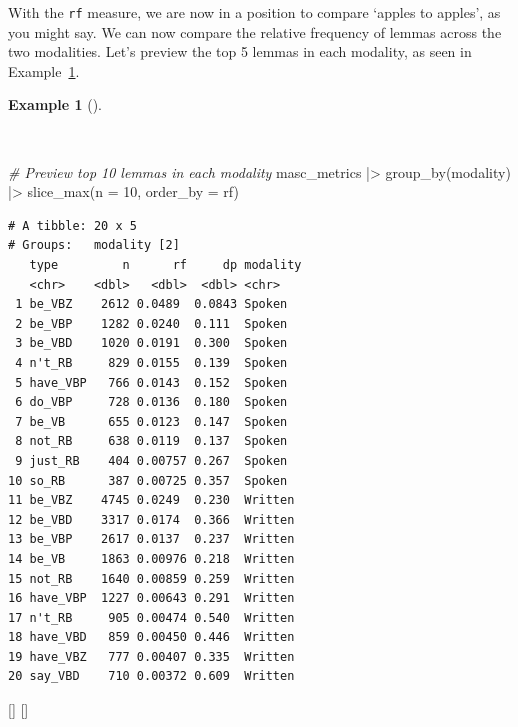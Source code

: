 \documentclass[
  letterpaper,
  krantz1]{latex/krantz-mod}
\newenvironment{Shaded}{\begin{snugshade}}{\end{snugshade}}
\newcommand{\AttributeTok}[1]{\textcolor[rgb]{0.00,0.00,0.00}{#1}}
\newcommand{\CommentTok}[1]{\textcolor[rgb]{0.00,0.00,0.00}{\textit{#1}}}
\newcommand{\DecValTok}[1]{\textcolor[rgb]{0.00,0.00,0.00}{#1}}
\newcommand{\FunctionTok}[1]{\textcolor[rgb]{0.00,0.00,0.00}{#1}}
\newcommand{\NormalTok}[1]{\textcolor[rgb]{0.00,0.00,0.00}{#1}}
\newcommand{\SpecialCharTok}[1]{\textcolor[rgb]{0.00,0.00,0.00}{#1}}
\newcommand{\cindex}[1]{%
  \StrSubstitute{#1}{_}{\_}[\temp]%
  \index{\temp}%
}
\theoremstyle{definition}
\theoremstyle{definition}
\newtheorem{example}{Example}[chapter]
\theoremstyle{remark}
\begin{document}
With the \texttt{rf} measure, we are now in a position to compare
`apples to apples', as you might say. We can now compare the relative
frequency of lemmas across the two modalities. Let's preview the top 5
lemmas in each modality, as seen in
Example~\ref{exm-explore-masc-relative-frequency-top}.

\begin{example}[]\protect\hypertarget{exm-explore-masc-relative-frequency-top}{}\label{exm-explore-masc-relative-frequency-top}

~

\begin{Shaded}
\begin{Highlighting}[numbers=left,,]
\CommentTok{\# Preview top 10 lemmas in each modality}
\NormalTok{masc\_metrics }\SpecialCharTok{|\textgreater{}}
  \FunctionTok{group\_by}\NormalTok{(modality) }\SpecialCharTok{|\textgreater{}}
  \FunctionTok{slice\_max}\NormalTok{(}\AttributeTok{n =} \DecValTok{10}\NormalTok{, }\AttributeTok{order\_by =}\NormalTok{ rf)}
\end{Highlighting}
\end{Shaded}

\vspace{5em}

\begin{verbatim}
# A tibble: 20 x 5
# Groups:   modality [2]
   type         n      rf     dp modality
   <chr>    <dbl>   <dbl>  <dbl> <chr>   
 1 be_VBZ    2612 0.0489  0.0843 Spoken  
 2 be_VBP    1282 0.0240  0.111  Spoken  
 3 be_VBD    1020 0.0191  0.300  Spoken  
 4 n't_RB     829 0.0155  0.139  Spoken  
 5 have_VBP   766 0.0143  0.152  Spoken  
 6 do_VBP     728 0.0136  0.180  Spoken  
 7 be_VB      655 0.0123  0.147  Spoken  
 8 not_RB     638 0.0119  0.137  Spoken  
 9 just_RB    404 0.00757 0.267  Spoken  
10 so_RB      387 0.00725 0.357  Spoken  
11 be_VBZ    4745 0.0249  0.230  Written 
12 be_VBD    3317 0.0174  0.366  Written 
13 be_VBP    2617 0.0137  0.237  Written 
14 be_VB     1863 0.00976 0.218  Written 
15 not_RB    1640 0.00859 0.259  Written 
16 have_VBP  1227 0.00643 0.291  Written 
17 n't_RB     905 0.00474 0.540  Written 
18 have_VBD   859 0.00450 0.446  Written 
19 have_VBZ   777 0.00407 0.335  Written 
20 say_VBD    710 0.00372 0.609  Written 
\end{verbatim}

 \cindex{group_by()}\cindex{slice_max()}

\end{example}
\end{document}

